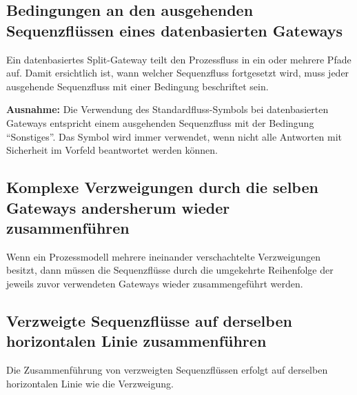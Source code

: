 \documentclass[12pt,report]{snetTeaching}
\begin{document}
\pagebreak[4]
\subsection{Bedingungen an den ausgehenden Sequenzflüssen eines datenbasierten Gateways}

Ein datenbasiertes Split-Gateway teilt den Prozessfluss in ein oder mehrere Pfade auf. Damit ersichtlich ist, wann welcher Sequenzfluss fortgesetzt wird, muss jeder ausgehende Sequenzfluss mit einer Bedingung beschriftet sein.

\textbf{Ausnahme:} Die Verwendung des Standardfluss-Symbols bei datenbasierten Gateways entspricht einem ausgehenden Sequenzfluss mit der Bedingung "`Sonstiges"'. Das Symbol wird immer verwendet, wenn nicht alle Antworten mit Sicherheit im Vorfeld beantwortet werden können. 


\begin{Rahmen}
	\hfill
\end{Rahmen}


\subsection{Komplexe Verzweigungen durch die selben Gateways andersherum wieder zusammenführen}
\label{sec:gwGleichSchliessen}

Wenn ein Prozessmodell mehrere ineinander verschachtelte Verzweigungen besitzt, dann müssen die Sequenzflüsse durch die umgekehrte Reihenfolge der jeweils zuvor verwendeten Gateways wieder zusammengeführt werden.


\begin{Rahmen}
	\hfill
\end{Rahmen}


\clearpage
\subsection{Verzweigte Sequenzflüsse auf derselben horizontalen Linie zusammenführen}

Die Zusammenführung von verzweigten Sequenzflüssen erfolgt auf derselben horizontalen Linie wie die Verzweigung.


\begin{Rahmen}
	\hfill
\end{Rahmen}
\end{document}
